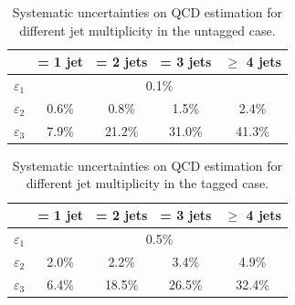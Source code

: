 \begin{table}\centering
\begin{tabular}{l c c c c}
\toprule
 & = 1 jet & = 2 jets & = 3 jets & $\ge$ 4 jets \\
\midrule
$\varepsilon_1 $ & \multicolumn{4}{c}{ 0.1\% } \\
$\varepsilon_2 $ &  0.6\% & 0.8\% & 1.5\% & 2.4\% \\
$\varepsilon_3 $ & 7.9\% &  21.2\% &   31.0\% &   41.3\% \\\bottomrule
\end{tabular}\caption{Systematic uncertainties on QCD estimation for different jet multiplicity in the untagged case.}\label{tab:systuncertuntag}
\end{table} 


\begin{table}\centering
\begin{tabular}{l c c c c}
\toprule
 & = 1 jet & = 2 jets & = 3 jets & $\ge$ 4 jets \\
\midrule
$\varepsilon_1 $ & \multicolumn{4}{c}{ 0.5\% } \\
$\varepsilon_2 $ &  2.0\% & 2.2\% & 3.4\% & 4.9\% \\
$\varepsilon_3 $ & 6.4\% &  18.5\% &   26.5\% &   32.4\% \\\bottomrule
\end{tabular}\caption{Systematic uncertainties on QCD estimation for different jet multiplicity in the tagged case.}\label{tab:systuncerttag}
\end{table} 





